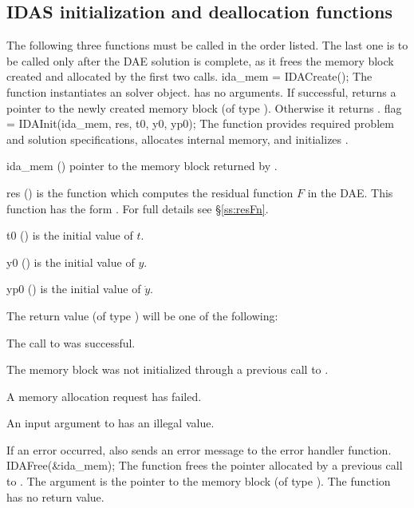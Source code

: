 \subsection{IDAS initialization and deallocation functions}
\label{sss:idainit}
The following three functions must be called in the order listed. The last one
is to be called only after the DAE solution is complete, as it frees the {\idas}
memory block created and allocated by the first two calls.
{
  ida\_mem = IDACreate();
}
{
  The function  instantiates an {\idas} solver object.
}
{
   has no arguments.
}
{
  If successful,  returns a pointer to the newly created
  {\idas} memory block (of type ).  Otherwise it returns .
}
{}
{
  flag = IDAInit(ida\_mem, res, t0, y0, yp0);
}
{
  The function  provides required problem and solution
  specifications, allocates internal memory, and initializes {\idas}.
}
{
  \begin{args}
  \item[ida\_mem] ()
    pointer to the {\idas} memory block returned by .
  \item[res] ()
    is the {\CC} function which computes the residual function $F$ in the DAE.
     This function has the form .
     For full details see \S\ref{ss:resFn}.
  \item[t0] ()
    is the initial value of $t$.
  \item[y0] ()
    is the initial value of $y$.
  \item[yp0] ()
    is the initial value of $\dot{y}$.
  \end{args}
}
{
  The return value  (of type ) will be one of the following:
  \begin{args}
  \item[\Id{IDA\_SUCCESS}]
    The call to  was successful.
  \item[\Id{IDA\_MEM\_NULL}]
    The {\idas} memory block was not initialized through a previous call to
    .
  \item[\Id{IDA\_MEM\_FAIL}]
    A memory allocation request has failed.
  \item[\Id{IDA\_ILL\_INPUT}]
    An input argument to  has an illegal value.
  \end{args}
}
{
  If an error occurred,  also sends an error message to the
  error handler function.
}
{
  IDAFree(\&ida\_mem);
}
{
  The function  frees the pointer allocated by
  a previous call to .
}
{
  The argument is the pointer to the {\idas} memory block (of type ).
}
{
  The function  has no return value.
}
{}


